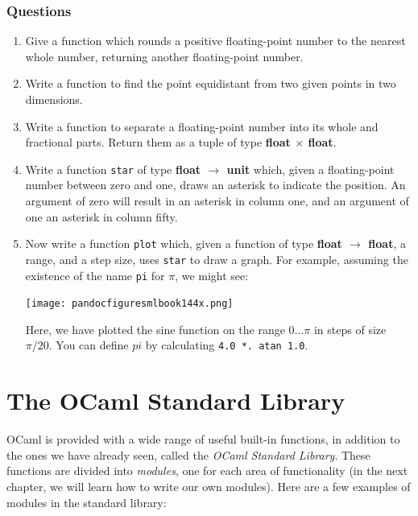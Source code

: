 \documentclass[]{book}
\begin{document}
\subsection*{Questions}
\begin{enumerate}
\item Give a function which rounds a positive floating-point number to the nearest whole number, returning another floating-point number.

\item Write a function to find the point equidistant from two given points in two dimensions.

\item Write a function to separate a floating-point number into its whole and fractional parts. Return them as a tuple of type \textsf{\textbf{float $\times$ float}}.

\item Write a function \texttt{star} of type \textsf{\textbf{float $\rightarrow$ unit}} which, given a floating-point number between zero and one, draws an asterisk to indicate the position. An argument of zero will result in an asterisk in column one, and an argument of one an asterisk in column fifty.

\item Now write a function \texttt{plot} which, given a function of type \textsf{\textbf{float $\rightarrow$ float}}, a range, and a step size, uses \texttt{star} to draw a graph. For example, assuming the existence of the name \texttt{pi} for $\pi$, we might see:

\medskip
\begin{center}
\noindent\texttt{[image: pandocfiguresmlbook144x.png]}
\end{center}
\medskip


\noindent Here, we have plotted the sine function on the range $0\ldots\pi$ in steps of size $\pi / 20$. You can define $pi$ by calculating \texttt{4.0 *.\ atan 1.0}.
\end{enumerate}


\cleardoublepage
\thispagestyle{empty}


\pagestyle{empty}


\chapter{The OCaml Standard Library}
\pagestyle{fancy}

OCaml is provided with a wide range of useful built-in functions, in addition to the ones we have already seen, called the \textit{OCaml Standard Library}. These functions are divided into \textit{modules}, one for each area of functionality (in the next chapter, we will learn how to write our own modules). Here are a few examples of modules in the standard library:
\end{document}
